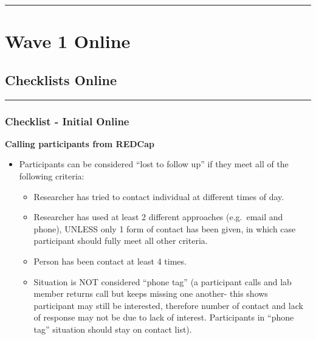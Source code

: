 \documentclass[]{book}
\providecommand{\tightlist}{%
  \setlength{\itemsep}{0pt}\setlength{\parskip}{0pt}}
\begin{document}
\begin{center}\rule{0.5\linewidth}{0.5pt}\end{center}

\hypertarget{wave-1-online}{%
\chapter{Wave 1 Online}\label{wave-1-online}}

\hypertarget{checklists-online}{%
\section{Checklists Online}\label{checklists-online}}

\begin{center}\rule{0.5\linewidth}{0.5pt}\end{center}

\hypertarget{checklist---initial-online}{%
\subsection{Checklist - Initial Online}\label{checklist---initial-online}}

\textbf{Calling participants from REDCap}

\begin{itemize}
\tightlist
\item
  Participants can be considered ``lost to follow up'' if they meet all of the following criteria:

  \begin{itemize}
  \tightlist
  \item
    Researcher has tried to contact individual at different times of day.
  \item
    Researcher has used at least 2 different approaches (e.g.~email and phone), UNLESS only 1 form of contact has been given, in which case participant should fully meet all other criteria.
  \item
    Person has been contact at least 4 times.
  \item
    Situation is NOT considered ``phone tag'' (a participant calls and lab member returns call but keeps missing one another- this shows participant may still be interested, therefore number of contact and lack of response may not be due to lack of interest. Participants in ``phone tag'' situation should stay on contact list).
  \end{itemize}
\end{itemize}
\end{document}
